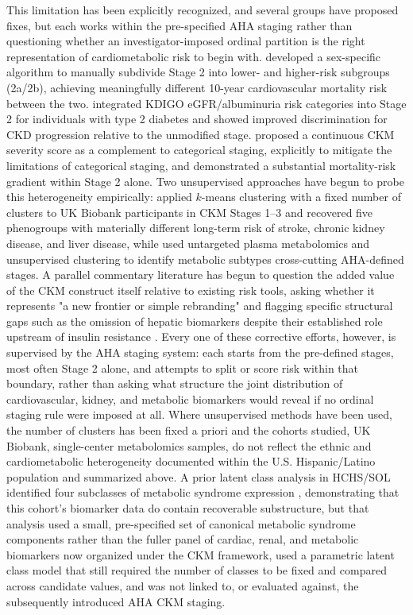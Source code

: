 \documentclass[11pt]{article}
\begin{document}
This limitation has been explicitly recognized, and several groups have proposed fixes, but each works within the pre-specified AHA staging rather than questioning whether an investigator-imposed ordinal partition is the right representation of cardiometabolic risk to begin with. \citet{tian2026riskbased} developed a sex-specific algorithm to manually subdivide Stage 2 into lower- and higher-risk subgroups (2a/2b), achieving meaningfully different 10-year cardiovascular mortality risk between the two. \citet{gohda2026refining} integrated KDIGO eGFR/albuminuria risk categories into Stage 2 for individuals with type 2 diabetes and showed improved discrimination for CKD progression relative to the unmodified stage. \citet{masoumi2026severity} proposed a continuous CKM severity score as a complement to categorical staging, explicitly to mitigate the limitations of categorical staging, and demonstrated a substantial mortality-risk gradient within Stage 2 alone. Two unsupervised approaches have begun to probe this heterogeneity empirically: \citet{yang2025datadriven} applied $k$-means clustering with a fixed number of clusters to UK Biobank participants in CKM Stages 1--3 and recovered five phenogroups with materially different long-term risk of stroke, chronic kidney disease, and liver disease, while \citet{zhou2025metabolomic} used untargeted plasma metabolomics and unsupervised clustering to identify metabolic subtypes cross-cutting AHA-defined stages. A parallel commentary literature has begun to question the added value of the CKM construct itself relative to existing risk tools, asking whether it represents "a new frontier or simple rebranding" \citep{mannegoehler2025rebranding} and flagging specific structural gaps such as the omission of hepatic biomarkers despite their established role upstream of insulin resistance \citep{cai2025hype}. Every one of these corrective efforts, however, is supervised by the AHA staging system: each starts from the pre-defined stages, most often Stage 2 alone, and attempts to split or score risk within that boundary, rather than asking what structure the joint distribution of cardiovascular, kidney, and metabolic biomarkers would reveal if no ordinal staging rule were imposed at all. Where unsupervised methods have been used, the number of clusters has been fixed a priori and the cohorts studied, UK Biobank, single-center metabolomics samples, do not reflect the ethnic and cardiometabolic heterogeneity documented within the U.S. Hispanic/Latino population and summarized above. A prior latent class analysis in HCHS/SOL identified four subclasses of metabolic syndrome expression \citep{arguelles2015characterization}, demonstrating that this cohort's biomarker data do contain recoverable substructure, but that analysis used a small, pre-specified set of canonical metabolic syndrome components rather than the fuller panel of cardiac, renal, and metabolic biomarkers now organized under the CKM framework, used a parametric latent class model that still required the number of classes to be fixed and compared across candidate values, and was not linked to, or evaluated against, the subsequently introduced AHA CKM staging.
\end{document}
